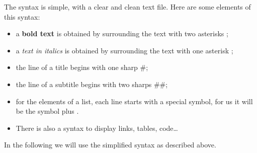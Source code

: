 \documentclass[11pt,class=report,crop=false]{standalone}
\begin{document}
\begin{cours}[Markdown]
The syntax is simple, with a clear and clean text file. Here are some elements of this syntax:
\begin{itemize}
  \item a \textbf{bold text} is obtained by surrounding the text with two asterisks \ci{**};
  \item a \emph{text in italics} is obtained by surrounding the text with one asterisk \ci{*};
  \item the line of a title begins with one sharp \#;
  \item the line of a subtitle begins with two sharps \#\#;
  \item for the elements of a list, each line starts with a special symbol, for us it will be the symbol \og{}plus\fg{} \ci{+}.
  \item There is also a syntax to display links, tables, code\ldots 
\end{itemize}

In the following we will use the simplified syntax as described above.
\end{cours}

\end{document}
